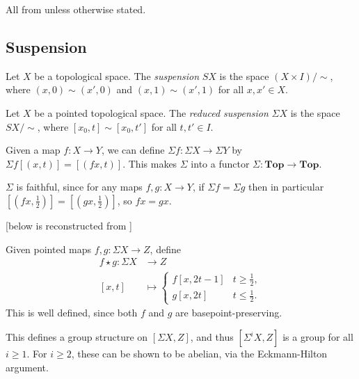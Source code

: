 \documentclass{MetricNotes2023}
\begin{document}
All from \autocite{hatcher} unless otherwise stated.

\subsection{Suspension}

\begin{definition}
Let \(X\) be a topological space. The \textit{suspension} \(SX\) is the space \newline\((X\times I)/\sim\), where \((x, 0)\sim (x', 0)\) and \((x,1)\sim (x',1)\) for all \(x,x'\in X\). 
\end{definition}

\begin{definition}
Let \(X\) be a pointed topological space. The \textit{reduced suspension} \(\Sigma X\) is the space \(SX/\sim\), where \([x_0, t]\sim [x_0, t']\) for all \(t,t'\in I\). 
\end{definition}

Given a map \(f : X \to Y\), we can define \(\Sigma f : \Sigma X \to \Sigma Y\) by \(\Sigma f[(x, t)]=[(fx, t)]\). This makes \(\Sigma \) into a functor \(\Sigma : \textbf{Top}\to \textbf{Top}\). 

\begin{remark}\label{2502141442}
\(\Sigma\) is faithful, since for any maps \(f, g : X\to Y\), if \(\Sigma f = \Sigma g\) then in particular \([(fx, \frac{1}{2})]=[(gx, \frac{1}{2})]\), so \(fx=gx\). 
\end{remark}  

[below is reconstructed from  \autocite{mazelgee}]

Given pointed maps \(f, g : \Sigma X \to Z\), define 
\begin{align*}
f \star g : \Sigma X &\to Z\\
[x,t]&\mapsto \begin{cases}
f[x,2t-1] & t \geq \frac{1}{2},\\
g[x,2t] &t\leq \frac{1}{2}.
\end{cases}
\end{align*}
This is well defined, since both \(f\) and \(g\) are basepoint-preserving. %

\begin{remark}
This defines a group structure on \([\Sigma X, Z]\), and thus \([\Sigma^i X, Z]\) is a group for all \(i\geq 1\). For \(i\geq 2\), these can be shown to be abelian, via the Eckmann-Hilton argument.
\end{remark}
\end{document}
